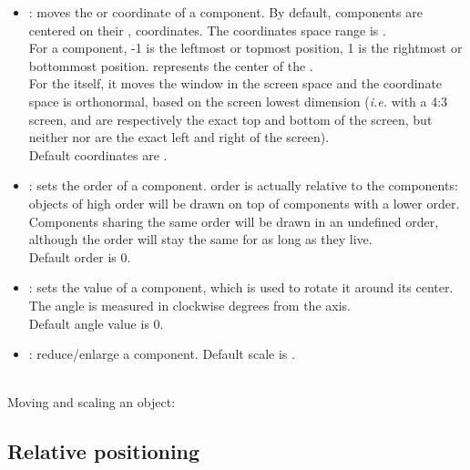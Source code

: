 \documentclass[a4paper,twoside]{report}
\newcommand{\subsublevel}[1]	{\subsection{#1}}
\begin{document}
\begin{itemize}
\item {}: moves the  or  coordinate of a component. By default, components are centered on their ,  coordinates. The coordinates space range is . \\
For a  component, -1 is the leftmost or topmost position, 1 is the rightmost or bottommost position.  represents the center of the . \\
For the  itself, it moves the window in the screen space and the coordinate space is orthonormal, based on the screen lowest dimension (\emph{i.e.} with a 4:3 screen,  and  are respectively the exact top and bottom of the screen, but neither  nor  are the exact left and right of the screen). \\
Default coordinates are .
\item {}: sets the  order of a component.  order is actually relative to the  components: objects of high  order will be drawn on top of components with a lower  order. Components sharing the same  order will be drawn in an undefined order, although the order will stay the same for as long as they live. \\
Default  order is 0.
\item {}: sets the  value of a component, which is used to rotate it around its center. The angle is measured in clockwise degrees from the  axis.\\
Default angle value is 0.
\item {}: reduce/enlarge a component. Default scale is .
\end{itemize}

\example \\
Moving and scaling an object:

\subsublevel{Relative positioning}
\label{relpos}

\end{document}
